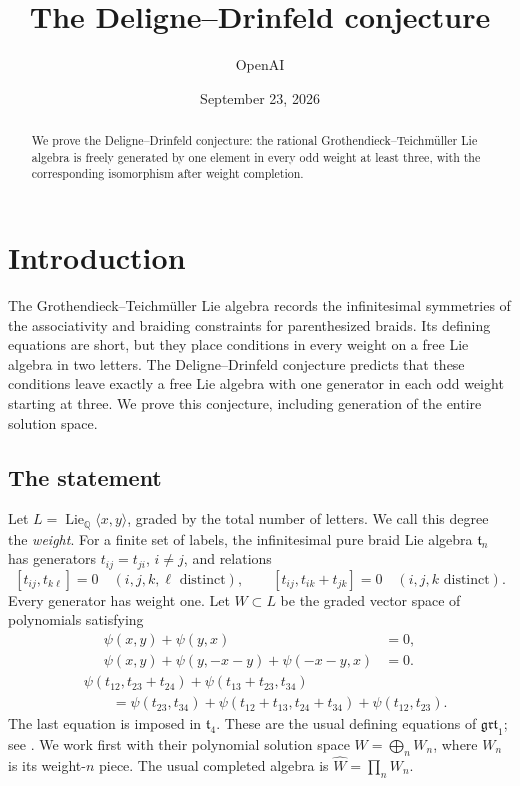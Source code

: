 \documentclass[11pt]{article}
\title{The Deligne--Drinfeld conjecture}
\author{OpenAI}
\date{September 23, 2026}
\newcommand{\Q}{\mathbb Q}
\newcommand{\Lie}{\operatorname{Lie}}
\newcommand{\grt}{\mathfrak{grt}_1}
\theoremstyle{definition}
\theoremstyle{remark}
\numberwithin{equation}{section}
\begin{document}
\maketitle
\begin{abstract}
We prove the Deligne--Drinfeld conjecture: the rational Grothendieck--Teichm\"uller Lie algebra is freely generated by one element in every odd weight at least three, with the corresponding isomorphism after weight completion.
\end{abstract}
\tableofcontents
\section{Introduction}\label{sec:introduction}

The Grothendieck--Teichm\"uller Lie algebra records the infinitesimal
symmetries of the associativity and braiding constraints for
parenthesized braids.  Its defining equations are short, but they place
conditions in every weight on a free Lie algebra in two letters.
The Deligne--Drinfeld conjecture predicts that these conditions leave
exactly a free Lie algebra with one generator in each odd weight
starting at three.  We prove this conjecture, including generation of
the entire solution space.

\subsection{The statement}
Let \(L=\Lie_{\Q}\langle x,y\rangle\), graded by the total number of
letters.  We call this degree the \emph{weight}.  For a finite set of
labels, the infinitesimal pure braid Lie algebra \(\mathfrak t_n\)
has generators \(t_{ij}=t_{ji}\), \(i\ne j\), and relations
\begin{equation}\label{eq:braid-relations}
 [t_{ij},t_{k\ell}]=0\quad(i,j,k,\ell\text{ distinct}),\qquad
 [t_{ij},t_{ik}+t_{jk}]=0\quad(i,j,k\text{ distinct}).
\end{equation}
Every generator has weight one.
Let \(W\subset L\) be the graded vector space of polynomials satisfying
\begin{align}
 \psi(x,y)+\psi(y,x)&=0,\label{eq:antisymmetry}\\
 \psi(x,y)+\psi(y,-x-y)+\psi(-x-y,x)&=0.\label{eq:three-term}
\end{align}
\begin{equation}\label{eq:pentagon}
\begin{aligned}
 &\psi(t_{12},t_{23}+t_{24})+\psi(t_{13}+t_{23},t_{34})\\
 &\qquad=
 \psi(t_{23},t_{34})+\psi(t_{12}+t_{13},t_{24}+t_{34})
 +\psi(t_{12},t_{23}).
\end{aligned}
\end{equation}
The last equation is imposed in \(\mathfrak t_4\).
These are the usual defining equations of \(\grt\);
see \cite[Section~6.1]{Willwacher}.  We work first with their polynomial
solution space \(W=\bigoplus_n W_n\), where \(W_n\) is its weight-\(n\)
piece.  The usual completed algebra is \(\widehat W=\prod_n W_n\).
\end{document}
